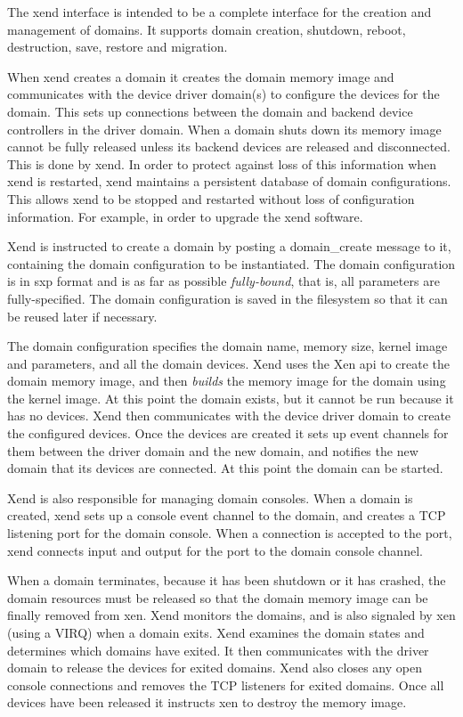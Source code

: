 \documentclass[11pt,twoside,final,openright]{xenstyle}
\begin{document}
The xend interface is intended to be a complete interface for the creation
and management of domains. It supports domain creation, shutdown, reboot,
destruction, save, restore and migration.

When xend creates a domain it creates the domain memory image and communicates
with the device driver domain(s) to configure the devices for the domain.
This sets up connections between the domain and backend device controllers
in the driver domain. When a domain shuts down its memory image cannot be fully released
unless its backend devices are released and disconnected. This is done by xend.
In order to protect against loss of this information when xend is restarted,
xend maintains a persistent database of domain configurations. This allows
xend to be stopped and restarted without loss of configuration information.
For example, in order to upgrade the xend software.

Xend is instructed to create a domain by posting a domain\_create message to it,
containing the domain configuration to be instantiated. The domain configuration
is in sxp format and is as far as possible {\em fully-bound}, that is, all
parameters are fully-specified. The domain configuration is saved in the filesystem
so that it can be reused later if necessary.

The domain configuration specifies the domain name, memory size, kernel image
and parameters, and all the domain devices. Xend uses the Xen api to create
the domain memory image, and then {\em builds} the memory image for the domain
using the kernel image. At this point the domain exists, but it cannot be run because
it has no devices. Xend then communicates with the device driver domain to create
the configured devices. Once the devices are created it sets up event channels
for them between the driver domain and the new domain, and notifies the new domain
that its devices are connected. At this point the domain can be started.

Xend is also responsible for managing domain consoles. When a domain is created,
xend sets up a console event channel to the domain, and creates a TCP listening port
for the domain console. When a connection is accepted to the port, xend
connects input and output for the port to the domain console channel.

When a domain terminates, because it has been shutdown or it has crashed, the
domain resources must be released so that the domain memory image can be
finally removed from xen. Xend monitors the domains, and is also signaled by
xen (using a VIRQ) when a domain exits. Xend examines the domain states and
determines which domains have exited. It then communicates with the driver domain
to release the devices for exited domains. Xend also closes any open console
connections and removes the TCP listeners for exited domains.
Once all devices have been released it instructs xen to destroy the memory image.
\end{document}
